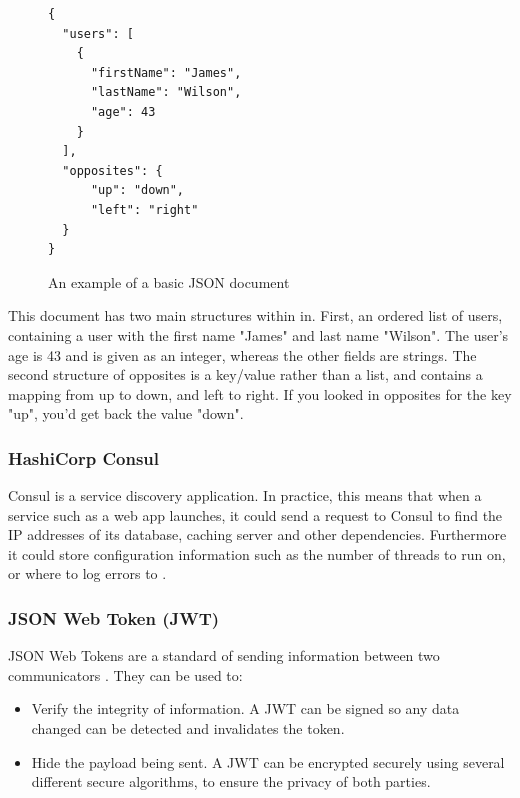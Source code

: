 \documentclass[12pt, letterpaper]{article}
\begin{document}
\begin{flushleft}
\begin{figure}[H]
\begin{verbatim}
{
  "users": [
    {
      "firstName": "James",
      "lastName": "Wilson",
      "age": 43
    }
  ],
  "opposites": {
      "up": "down",
      "left": "right"
  }
}
\end{verbatim}
\caption{An example of a basic JSON document}
\end{figure}
\end{flushleft}

\begin{flushleft}
This document has two main structures within in. First, an ordered list of users, containing a user with the first name "James" and last name "Wilson". The user's age is 43 and is given as an integer, whereas the other fields are strings. The second structure of opposites is a key/value rather than a list, and contains a mapping from up to down, and left to right. If you looked in opposites for the key "up", you'd get back the value "down".
\end{flushleft}

\subsubsection{HashiCorp Consul}\label{sec:consul-desc}
Consul is a service discovery application. In practice, this means that when a service such as a web app launches, it could send a request to Consul to find the IP addresses of its database, caching server and other dependencies. Furthermore it could store configuration information such as the number of threads to run on, or where to log errors to \cite{consul-desc}.

\subsubsection{JSON Web Token (JWT)}\label{sec:jwt-desc}
JSON Web Tokens are a standard of sending information between two communicators \cite{jwt-desc}. They can be used to:

\begin{itemize}
\item Verify the integrity of information. A JWT can be signed so any data changed can be detected and invalidates the token.
\item Hide the payload being sent. A JWT can be encrypted securely using several different secure algorithms, to ensure the privacy of both parties.
\end{itemize}
\cite{jwt-desc}
\end{document}
